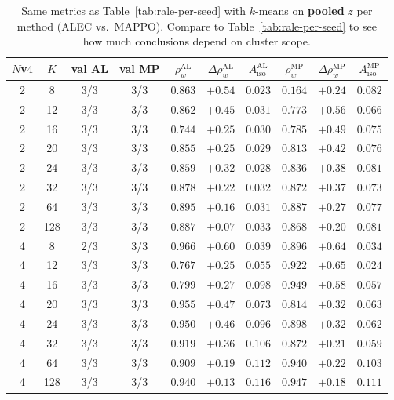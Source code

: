 \begin{table}[t]
\centering
\small
\caption{Same metrics as Table~\ref{tab:rale-per-seed} with $k$-means on \textbf{pooled} $z$ per method (ALEC vs.\ MAPPO). Compare to Table~\ref{tab:rale-per-seed} to see how much conclusions depend on cluster scope.}
\label{tab:rale-per-method}
\begin{tabular}{cccccccccc}
\toprule
$N$v$4$ & $K$ & val AL & val MP & $\rho_w^{\mathrm{AL}}$ & $\Delta\rho_w^{\mathrm{AL}}$ & $A_{\mathrm{iso}}^{\mathrm{AL}}$ & $\rho_w^{\mathrm{MP}}$ & $\Delta\rho_w^{\mathrm{MP}}$ & $A_{\mathrm{iso}}^{\mathrm{MP}}$ \\
\midrule
2 & 8 & 3/3 & 3/3 & $0.863$ & $+0.54$ & $0.023$ & $0.164$ & $+0.24$ & $0.082$ \\
2 & 12 & 3/3 & 3/3 & $0.862$ & $+0.45$ & $0.031$ & $0.773$ & $+0.56$ & $0.066$ \\
2 & 16 & 3/3 & 3/3 & $0.744$ & $+0.25$ & $0.030$ & $0.785$ & $+0.49$ & $0.075$ \\
2 & 20 & 3/3 & 3/3 & $0.855$ & $+0.25$ & $0.029$ & $0.813$ & $+0.42$ & $0.076$ \\
2 & 24 & 3/3 & 3/3 & $0.859$ & $+0.32$ & $0.028$ & $0.836$ & $+0.38$ & $0.081$ \\
2 & 32 & 3/3 & 3/3 & $0.878$ & $+0.22$ & $0.032$ & $0.872$ & $+0.37$ & $0.073$ \\
2 & 64 & 3/3 & 3/3 & $0.895$ & $+0.16$ & $0.031$ & $0.887$ & $+0.27$ & $0.077$ \\
2 & 128 & 3/3 & 3/3 & $0.887$ & $+0.07$ & $0.033$ & $0.868$ & $+0.20$ & $0.081$ \\
\midrule
4 & 8 & 2/3 & 3/3 & $0.966$ & $+0.60$ & $0.039$ & $0.896$ & $+0.64$ & $0.034$ \\
4 & 12 & 3/3 & 3/3 & $0.767$ & $+0.25$ & $0.055$ & $0.922$ & $+0.65$ & $0.024$ \\
4 & 16 & 3/3 & 3/3 & $0.799$ & $+0.27$ & $0.098$ & $0.949$ & $+0.58$ & $0.057$ \\
4 & 20 & 3/3 & 3/3 & $0.955$ & $+0.47$ & $0.073$ & $0.814$ & $+0.32$ & $0.063$ \\
4 & 24 & 3/3 & 3/3 & $0.950$ & $+0.46$ & $0.096$ & $0.898$ & $+0.32$ & $0.062$ \\
4 & 32 & 3/3 & 3/3 & $0.919$ & $+0.36$ & $0.106$ & $0.872$ & $+0.21$ & $0.059$ \\
4 & 64 & 3/3 & 3/3 & $0.909$ & $+0.19$ & $0.112$ & $0.940$ & $+0.22$ & $0.103$ \\
4 & 128 & 3/3 & 3/3 & $0.940$ & $+0.13$ & $0.116$ & $0.947$ & $+0.18$ & $0.111$ \\

\end{tabular}
\end{table}
